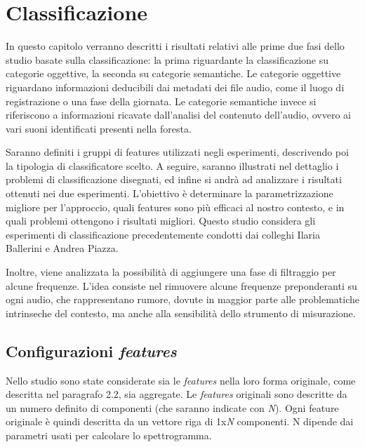 \chapter{Classificazione}
In questo capitolo verranno descritti i risultati relativi alle prime due fasi dello studio basate
sulla classificazione: la prima riguardante la classificazione su categorie oggettive, la seconda
su categorie semantiche. Le categorie oggettive riguardano informazioni deducibili dai
metadati dei file audio, come il luogo di registrazione o una fase della giornata. Le categorie
semantiche invece si riferiscono a informazioni ricavate dall’analisi del contenuto dell’audio,
ovvero ai vari suoni identificati presenti nella foresta.

Saranno definiti i gruppi di features utilizzati negli esperimenti, descrivendo poi la tipologia
di classificatore scelto. A seguire, saranno illustrati nel dettaglio i problemi di classificazione
disegnati, ed infine si andrà ad analizzare i risultati ottenuti nei due esperimenti.
L’obiettivo è determinare la parametrizzazione migliore per l’approccio, quali features sono
più efficaci al nostro contesto, e in quali problemi ottengono i risultati migliori. Questo studio
considera gli esperimenti di classificazione precedentemente condotti dai colleghi Ilaria
Ballerini e Andrea Piazza.

Inoltre, viene analizzata la possibilità di aggiungere una fase di filtraggio per alcune
frequenze. L’idea consiste nel rimuovere alcune frequenze preponderanti su ogni audio, che
rappresentano rumore, dovute in maggior parte alle problematiche intrinseche del contesto,
ma anche alla sensibilità dello strumento di misurazione.

\section{Configurazioni \textit{features}}
Nello studio sono state considerate sia le \textit{features} nella loro forma originale, come descritta
nel paragrafo 2.2, sia aggregate. Le \textit{features} originali sono descritte da un numero definito di
componenti (che saranno indicate con \textit{N}). Ogni feature originale è quindi descritta da un
vettore riga di 1x\textit{N} componenti. N dipende dai parametri usati per calcolare lo
spettrogramma.

